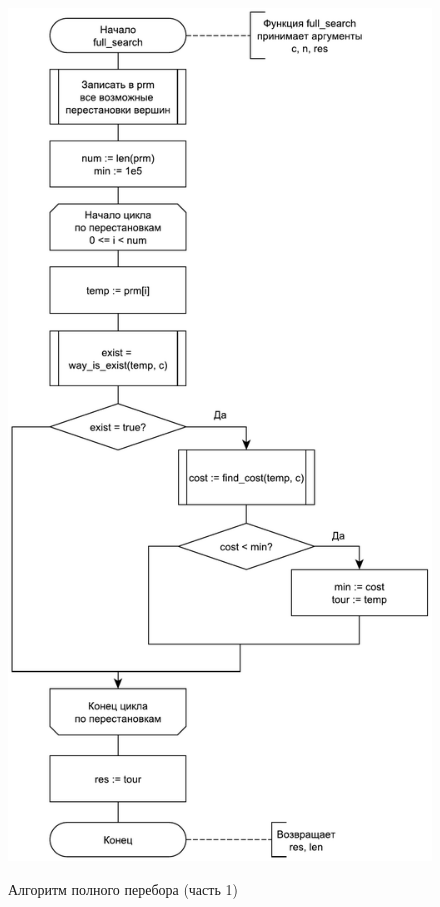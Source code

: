 \begin{figure}[h]
	\begin{center}
		{\includegraphics[scale = 0.6]{schemes/full}}
		\caption{Алгоритм полного перебора (часть 1)}
		\label{fig1:image}
	\end{center}
\end{figure}

